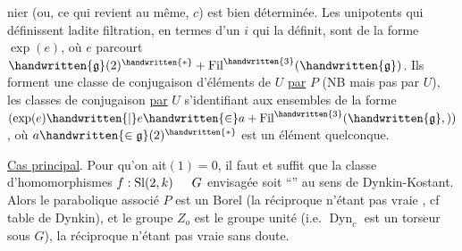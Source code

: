 nier (ou, ce qui revient au même, $c$) est bien déterminée. Les unipotents qui définissent ladite filtration, en termes d'un $i$ qui la définit, sont  de la forme $\exp(e)$, où $e$ parcourt $\handwritten{\mathfrak{g}}(2)^{\handwritten{*}}+\operatorname{Fil}^{\handwritten{3}}(\handwritten{\mathfrak{g}})$. Ils forment une classe de conjugaison d'éléments de $U$ \uline{par} $P$ (NB mais pas par $U$), les classes de conjugaison \uline{par} $U$ s'identifiant aux ensembles de la forme $(\exp(e)\handwritten{\mid}e\handwritten{\in}a+\operatorname{Fil}^{\handwritten{3}}(\handwritten{\mathfrak{g}},))$, où $a\handwritten{\in\mathfrak{g}}(2)^{\handwritten{*}}$ est un élément quelconque.

\uline{Cas principal}. Pour qu'on ait\hspace{1.5em}$(1)=0$, il faut et suffit que  la classe d'homomorphismes $f:\operatorname{Sl}(2,k)\hspace{1.5em}G$ envisagée soit ``'' au sens de Dynkin-Kostant. Alors le parabolique associé $P$ est un Borel (la réciproque n'étant pas vraie , cf table de Dynkin), et le groupe $Z_o$ est le groupe unité (i.e. $\operatorname{Dyn}_c$ est un torseur sous $G$), la réciproque n'étant pas vraie sans doute.
